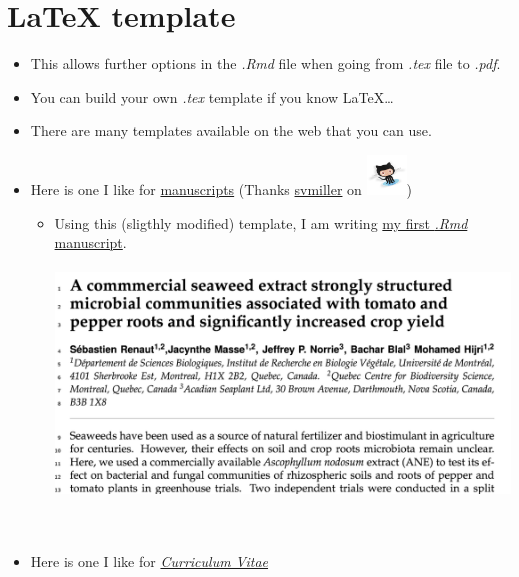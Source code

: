 \documentclass[]{article}
\providecommand{\tightlist}{%
  \setlength{\itemsep}{0pt}\setlength{\parskip}{0pt}}
\begin{document}
\hypertarget{latex-template}{%
\section{LaTeX template}\label{latex-template}}

\begin{itemize}
\item
  This allows further options in the \emph{.Rmd} file when going from
  \emph{.tex} file to \emph{.pdf}.
\item
  You can build your own \emph{.tex} template if you know LaTeX\ldots{}
\item
  There are many templates available on the web that you can use.
\item
  Here is one I like for
  \href{https://github.com/svmiller/svm-r-markdown-templates/blob/master/svm-latex-ms.tex}{manuscripts}
  (Thanks \href{https://github.com/svmiller}{svmiller} on
  \includegraphics[width=0.41667in,height=\textheight]{../figures/octocat.png})

  \begin{itemize}
  \tightlist
  \item
    Using this (sligthly modified) template, I am writing
    \href{https://github.com/seb951/Acadian_seaplants/blob/master/manuscript_Rmd/Acadian_seaplants_v5.pdf}{my
    first \emph{.Rmd} manuscript}.\\
    \hspace*{0.333em}\\
    \includegraphics[width=5.20833in,height=\textheight]{../figures/acadian.png}\\
    \hspace*{0.333em}\\
    \hspace*{0.333em}\\
  \end{itemize}
\item
  Here is one I like for
  \href{https://github.com/svmiller/svm-r-markdown-templates/blob/master/svm-latex-cv.tex}{\emph{Curriculum
  Vitae}}


\end{itemize}
\end{document}
